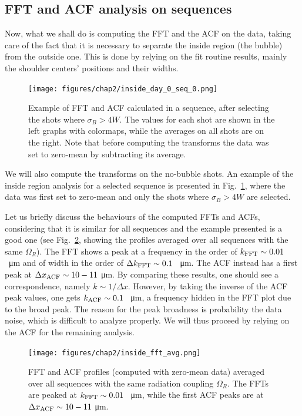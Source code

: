\subsection{FFT and ACF analysis on sequences}
Now, what we shall do is computing the FFT and the ACF on the data, taking care of the fact that it is necessary to separate the inside region (the bubble) from the outside one. This is done by relying on the fit routine results, mainly the shoulder centers' positions and their widths.
\begin{figure}[h!]
    \centering
    \texttt{[image: figures/chap2/inside\_day\_0\_seq\_0.png]}
    \caption{Example of FFT and ACF calculated in a sequence, after selecting the shots where $\sigma_B > 4W$. The values for each shot are shown in the left graphs with colormaps, while the averages on all shots are on the right. Note that before computing the transforms the data was set to zero-mean by subtracting its average.}
    \label{fig:inside_00}
\end{figure}
We will also compute the transforms on the no-bubble shots. An example of the inside region analysis for a selected sequence is presented in Fig.\ \ref{fig:inside_00}, where the data was first set to zero-mean and only the shots where $\sigma_B > 4W$ are selected.

Let us briefly discuss the behaviours of the computed FFTs and ACFs, considering that it is similar for all sequences and the example presented is a good one (see Fig.\ \ref{fig:inside_avg}, showing the profiles averaged over all sequences with the same $\Omega_R$). The FFT shows a peak at a frequency in the order of $k_{\rm FFT} \sim 0.01$ \unit{\per\micro\meter} and of width in the order of $\Delta k_{\rm FFT} \sim 0.1$ \unit{\per\micro\meter}. The ACF instead has a first peak at $\Delta x_{\rm ACF} \sim 10-11$ \unit{\micro\meter}. By comparing these results, one should see a correspondence, namely $k \sim 1/\Delta x$. However, by taking the inverse of the ACF peak values, one gets $k_{\rm ACF} \sim 0.1$ \unit{\per\micro\meter}, a frequency hidden in the FFT plot due to the broad peak. The reason for the peak broadness is probability the data noise, which is difficult to analyze properly. We will thus proceed by relying on the ACF for the remaining analysis.

\begin{figure}[t!]
    \centering
    \texttt{[image: figures/chap2/inside\_fft\_avg.png]}
    \caption{FFT and ACF profiles (computed with zero-mean data) averaged over all sequences with the same radiation coupling $\Omega_R$. The FFTs are peaked at $k_{\rm FFT} \sim 0.01$ \unit{\per\micro\meter}, while the first ACF peaks are at $\Delta x_{\rm ACF} \sim 10-11$ \unit{\micro\meter}.}
    \label{fig:inside_avg}
\end{figure}

